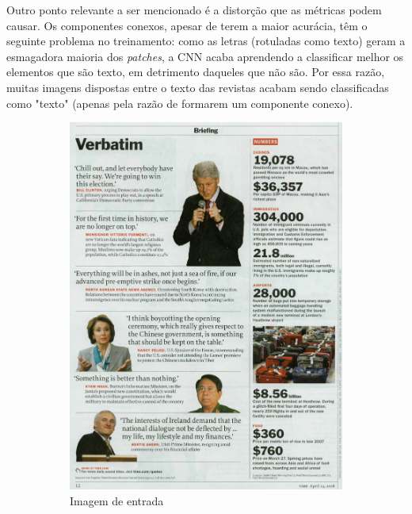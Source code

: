 \documentclass{article}
\begin{document}
	Outro ponto relevante a ser mencionado é a distorção que as métricas podem causar. Os componentes conexos, apesar de terem a maior acurácia, têm o seguinte problema no treinamento: como as letras (rotuladas como texto) geram a esmagadora maioria dos \textit{patches}, a CNN acaba aprendendo a classificar melhor os elementos que são texto, em detrimento daqueles que não são. Por essa razão, muitas imagens dispostas entre o texto das revistas acabam sendo classificadas como "texto" (apenas pela razão de formarem um componente conexo). 
	
	\begin{figure}[H]			
		\caption[Imagens de entrada e saída]
		{Algumas imagens da folha da revista foram classificadas como "texto"}
		\centering
		\begin{subfigure}[b]{90px}				
			\caption{Imagem de entrada}
			\includegraphics[width=\textwidth]{16.jpg}
		\end{subfigure}
		\qquad
		\begin{subfigure}[b]{90px}				

\end{subfigure}
\end{figure}
\end{document}
